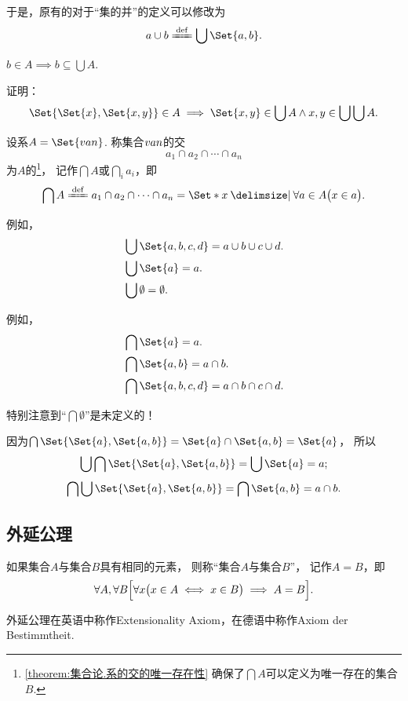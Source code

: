 于是，原有的对于“集的并”的定义可以修改为\[
a \cup b \defeq \bigcup\Set{a,b}.
\]

\begin{property}
\(b \in A \implies b \subseteq \bigcup A\).
\end{property}

\begin{example}
证明：
\begin{equation}
	\Set{ \Set{x}, \Set{x,y} } \in A
	\implies
	\Set{x,y} \in \bigcup A
	\land
	x,y \in \bigcup\bigcup A.
\end{equation}
\end{example}

\begin{definition}
设系\(A = \Set{\v{a}{n}}\).
称集合\(v{a}{n}\)的交\[
	a_1 \cap a_2 \cap \dotsb \cap a_n
\]为\(A\)的\footnote{%
\cref{theorem:集合论.系的交的唯一存在性} 确保了\(\bigcap A\)可以定义为唯一存在的集合\(B\).
}，%
记作\(\bigcap A\)或\(\bigcap\limits_i a_i\)，即\[
	\bigcap A
	\defeq
	a_1 \cap a_2 \cap \dotsb \cap a_n
	= \Set*{ x \given \forall a \in A \bigl(x \in a\bigr) }.
\]
\end{definition}

例如，
\begin{align*}
&\bigcup\Set{a,b,c,d} = a \cup b \cup c \cup d. \\
&\bigcup\Set{a} = a. \\
&\bigcup\emptyset = \emptyset.
\end{align*}

例如，
\begin{align*}
&\bigcap\Set{a} = a. \\
&\bigcap\Set{a,b} = a \cap b. \\
&\bigcap\Set{a,b,c,d} = a \cap b \cap c \cap d.
\end{align*}

特别注意到“\(\bigcap\emptyset\)”是未定义的！

\begin{example}
因为\(\bigcap\Set{ \Set{a}, \Set{a,b} } = \Set{a} \cap \Set{a,b} = \Set{a}\)，%
所以\[
\bigcup \bigcap \Set{ \Set{a}, \Set{a,b} } = \bigcup \Set{a} = a;
\]\[
\bigcap \bigcup \Set{ \Set{a}, \Set{a,b} } = \bigcap \Set{a,b} = a \cap b.
\]
\end{example}


\subsection{外延公理}
\begin{axiom}[外延公理]
如果集合\(A\)与集合\(B\)具有相同的元素，
则称“集合\(A\)与集合\(B\)”，
记作\(A=B\)，即\[
	\forall A, \forall B \Bigl[
		\forall x \bigl( x \in A \iff x \in B \bigr)
		\implies A = B
	\Bigr].
\]
\end{axiom}
外延公理在英语中称作Extensionality Axiom，在德语中称作Axiom der Bestimmtheit.


